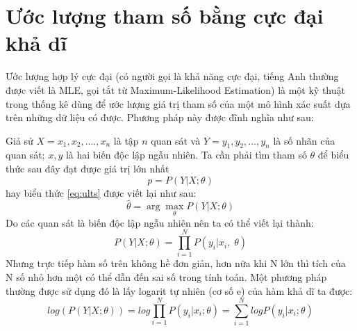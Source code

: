 \section{Ước lượng tham số bằng cực đại khả dĩ}
 Ước lượng hợp lý cực đại (có người gọi là khả năng cực đại, tiếng Anh thường được viết là MLE, gọi tắt từ Maximum-Likelihood Estimation) \cite{mlcb} là một kỹ thuật trong thống kê dùng để ước lượng giá trị tham số của một mô hình xác suất dựa trên những dữ liệu có được. Phương pháp này được đĩnh nghĩa như sau:\par
Giả sử $X=x_1,x_2,....,x_n$ là tập $n$ quan sát và $Y=y_1,y_2,...,y_n$ là số nhãn của quan sát; $x,y$ là hai biến độc lập ngẫu nhiên. Ta cần phải tìm tham số $\theta$ để biểu thức sau đây đạt được giá trị lớn nhất
\begin{equation}
\label{eq:ults}
p = P(Y|X;\theta)
\end{equation} 
hay biểu thức \ref{eq:ults} được viết lại như sau:
\begin{equation}
\widehat{\theta} = \arg\max_{\theta}P(Y|X;\theta)
\end{equation}
Do các quan sát là biến độc lập ngẫu nhiên nên ta có thể viết lại thành:
\begin{equation}
P(Y|X;\theta) = \prod^N_{i=1}P(y_i|x_i,\;\theta)
\end{equation}
Nhưng trực tiếp hàm số trên không hề đơn giản, hơn nữa khi N lớn thì tích của N số nhỏ hơn một có thể dẫn đến sai số trong tính toán. Một phương pháp thường được sử dụng đó là lấy logarit	tự nhiên (cơ số e) của hàm khả dĩ ta được:
\begin{equation}
log(P(Y|X;\theta)) = log\prod_{i=1}^N P(y_i|x_i;\theta)=\sum_{i=1}^NlogP(y_i|x_i;\theta)
\end{equation}
